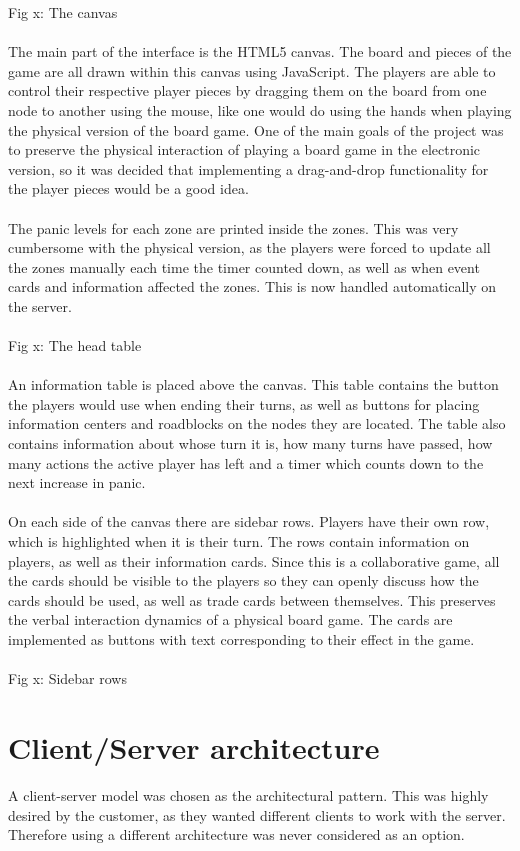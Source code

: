 Fig x: The canvas\\
\\
The main part of the interface is the HTML5 canvas. The board and pieces of the game are all drawn within this canvas using JavaScript. The players are able to control their respective player pieces by dragging them on the board from one node to another using the mouse, like one would do using the hands when playing the physical version of the board game. One of the main goals of the project was to preserve the physical interaction of playing a board game in the electronic version, so it was decided that implementing a drag-and-drop functionality for the player pieces would be a good idea. \\
\\
The panic levels for each zone are printed inside the zones. This was very cumbersome with the physical version, as the players were forced to update all the zones manually each time the timer counted down, as well as when event cards and information affected the zones. This is now handled automatically on the server. \\
\\ %
Fig x: The head table\\
\\
An information table is placed above the canvas. This table contains the button the players would use when ending their turns, as well as buttons for placing information centers and roadblocks on the nodes they are located. The table also contains information about whose turn it is, how many turns have passed, how many actions the active player has left and a timer which counts down to the next increase in panic. \\
\\
On each side of the canvas there are sidebar rows. Players have their own row, which is highlighted when it is their turn. The rows contain information on players, as well as their information cards. Since this is a collaborative game, all the cards should be visible to the players so they can openly discuss how the cards should be used, as well as trade cards between themselves. This preserves the verbal interaction dynamics of a physical board game. The cards are implemented as buttons with text corresponding to their effect in the game. \\
\\ %
Fig x: Sidebar rows



\section{Client/Server architecture}
A client-server model was chosen as the architectural pattern. This was highly desired by the customer, as they wanted different clients
to work with the server. Therefore using a different architecture was never considered as an option.

